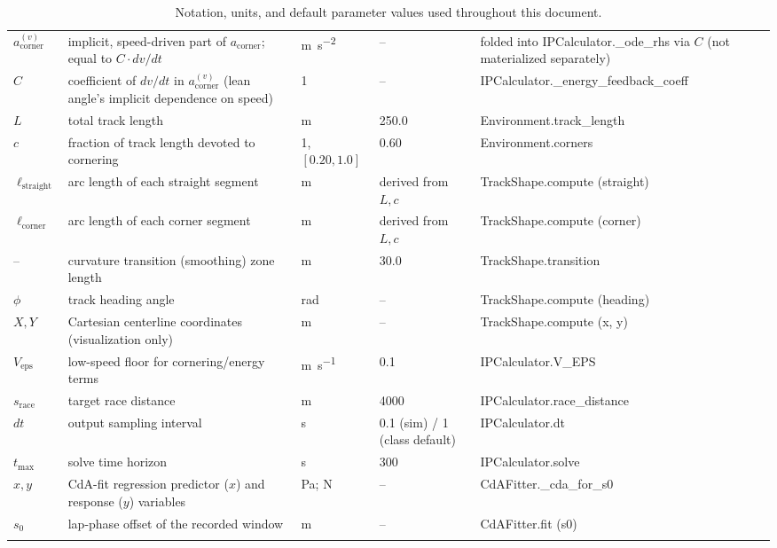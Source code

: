 {\begin{longtable}{@{}p{} p{} p{} p{} >{\ttfamily}p{}@{}}
    $a_{\mathrm{corner}}^{(v)}$ & implicit, speed-driven part of $a_{\mathrm{corner}}$; equal to $C \cdot dv/dt$ & \si{\metre\per\second\squared} & -- & folded into IPCalculator.\allowbreak \_ode\_rhs via $C$ (not materialized separately) \\
    $C$ & coefficient of $dv/dt$ in $a_{\mathrm{corner}}^{(v)}$ (lean angle's implicit dependence on speed) & \num{1} & -- & IPCalculator.\allowbreak \_energy\_feedback\_coeff \\
    $L$ & total track length & \si{\metre} & \num{250.0} & Environment.\allowbreak track\_length \\
    $c$ & fraction of track length devoted to cornering & \num{1}, $[0.20, 1.0]$ & \num{0.60} & Environment.\allowbreak corners \\
    $\ell_{\mathrm{straight}}$ & arc length of each straight segment & \si{\metre} & derived from $L, c$ & TrackShape.compute (straight) \\
    $\ell_{\mathrm{corner}}$ & arc length of each corner segment & \si{\metre} & derived from $L, c$ & TrackShape.compute (corner) \\
    -- & curvature transition (smoothing) zone length & \si{\metre} & \num{30.0} & TrackShape.\allowbreak transition \\
    $\phi$ & track heading angle & \si{\radian} & -- & TrackShape.compute (heading) \\
    $X, Y$ & Cartesian centerline coordinates (visualization only) & \si{\metre} & -- & TrackShape.compute (x, y) \\
    $V_{\mathrm{eps}}$ & low-speed floor for cornering/energy terms & \si{\metre\per\second} & \num{0.1} & IPCalculator.\allowbreak V\_EPS \\
    $s_{\mathrm{race}}$ & target race distance & \si{\metre} & \num{4000} & IPCalculator.\allowbreak race\_distance \\
    $dt$ & output sampling interval & \si{\second} & \num{0.1} (sim) / \num{1} (class default) & IPCalculator.dt \\
    $t_{\max}$ & solve time horizon & \si{\second} & \num{300} & IPCalculator.\allowbreak solve \\
    $x, y$ & CdA-fit regression predictor ($x$) and response ($y$) variables & Pa; N & -- & CdAFitter.\allowbreak \_cda\_for\_s0 \\
    $s_0$ & lap-phase offset of the recorded window & \si{\metre} & -- & CdAFitter.fit (s0) \\
    \bottomrule
    \caption{Notation, units, and default parameter values used throughout this
    document.}
    \label{tab:notation}
\end{longtable}
}
